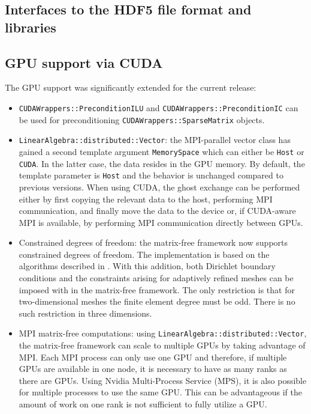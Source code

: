 \documentclass{ansarticle-preprint}
\begin{document}
\subsection{Interfaces to the HDF5 file format and libraries}
\label{subsec:hdf5}

\subsection{GPU support via CUDA}
\label{subsec:gpu}

The GPU support was significantly extended for the current release:
\begin{itemize}
  \item \texttt{CUDAWrappers::PreconditionILU} and \texttt{CUDAWrappers::PreconditionIC}
    can be used for preconditioning \texttt{CUDAWrappers::SparseMatrix} objects.
  \item \texttt{LinearAlgebra::distributed::Vector}: the MPI-parallel vector
    class has gained a second template argument \texttt{MemorySpace} which can
    either be \texttt{Host} or \texttt{CUDA}. In the latter case, the data
    resides in the GPU memory. By default, the template parameter is
    \texttt{Host} and the behavior is unchanged compared to previous versions.
    When using CUDA, the ghost exchange can be performed either by first copying
    the relevant data to the host, performing MPI communication, and finally
    move the data to the device or, if CUDA-aware MPI is available, by
    performing MPI communication directly between GPUs.
  \item Constrained degrees of freedom: the matrix-free framework now
    supports constrained degrees of freedom. The implementation is based on the algorithms described in
    \cite{ljungkvist2017}. With this addition, both Dirichlet
    boundary conditions and the constraints arising for adaptively
    refined meshes can be imposed with in the matrix-free framework. The only restriction is that for two-dimensional meshes the
    finite element degree must be odd.  There is no such restriction in three
    dimensions.
  \item MPI matrix-free computations: using \texttt{LinearAlgebra::distributed::Vector}, the
    matrix-free framework can scale to multiple GPUs by taking
    advantage of MPI. Each MPI process can only use one GPU and therefore, if
    multiple GPUs are available in one node, it is necessary to have as many
    ranks as there are GPUs. Using Nvidia Multi-Process Service (MPS), it is also possible
    for multiple processes to use the same GPU. This can be advantageous if the
    amount of work on one rank is not sufficient to fully utilize a GPU.
\end{itemize}
\end{document}

